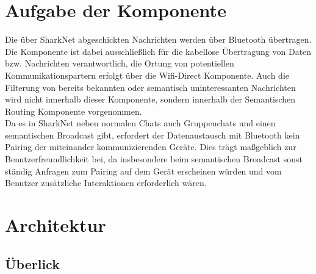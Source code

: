 

\section{Aufgabe der Komponente}
Die über SharkNet abgeschickten Nachrichten werden über Bluetooth übertragen. Die Komponente ist dabei ausschließlich für die kabellose Übertragung von Daten bzw. Nachrichten verantwortlich, die Ortung von potentiellen Kommunikationspartern erfolgt über die Wifi-Direct Komponente. Auch die Filterung von bereits bekannten oder semantisch uninteressanten Nachrichten wird nicht innerhalb dieser Komponente, sondern innerhalb der Semantischen Routing Komponente vorgenommen.
\\Da es in SharkNet neben normalen Chats auch Gruppenchats und einen semantischen Broadcast gibt, erfordert der Datenaustausch mit Bluetooth kein Pairing der miteinander kommunizierenden Geräte. Dies trägt maßgeblich zur Benutzerfreundlichkeit bei, da insbesondere beim semantischen Broadcast sonst ständig Anfragen zum Pairing auf dem Gerät erscheinen würden und vom Benutzer zusätzliche Interaktionen erforderlich wären.



\section{Architektur}

\subsection{Überlick}\label{ch:bluetoothoverview}


